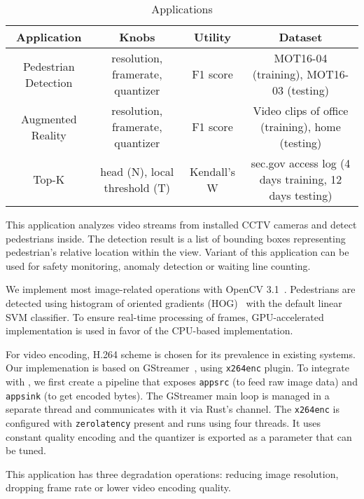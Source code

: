\begin{table*}
  \small
  \centering
  \begin{tabular}{|c|c|c|c|}
    \hline
    Application & Knobs & Utility & Dataset \\
    \hline
    Pedestrian Detection & resolution, framerate, quantizer
                        & F1 score & MOT16-04 (training), MOT16-03 (testing) \\
    \hline
    Augmented Reality & resolution, framerate, quantizer
                        & F1 score & Video clips of office (training), home (testing) \\
    \hline
    Top-K & head (N), local threshold (T) & Kendall's W & sec.gov access log
                                                          (4 days training, 12 days testing)  \\
    \hline
  \end{tabular}
  \caption{\sysname{} Applications}
  \label{tab:apps}
\end{table*}

 This application analyzes video streams from
installed CCTV cameras and detect pedestrians inside. The detection result is a
list of bounding boxes representing pedestrian's relative location within the
view. Variant of this application can be used for safety monitoring, anomaly
detection or waiting line counting.

We implement most image-related operations with OpenCV
3.1~\cite{opencvlibrary}. Pedestrians are detected using histogram of oriented
gradients (HOG)~\cite{dalal2005histograms} with the default linear SVM
classifier. To ensure real-time processing of frames, GPU-accelerated
implementation is used in favor of the CPU-based implementation.

For video encoding, H.264 scheme is chosen for its prevalence in existing
systems. Our implemenation is based on GStreamer~\cite{gstreamer}, using
\texttt{x264enc} plugin. To integrate with \sysname{}, we first create a
pipeline that exposes \texttt{appsrc} (to feed raw image data) and
\texttt{appsink} (to get encoded bytes). The GStreamer main loop is managed in a
separate thread and \sysname{} communicates with it via Rust's channel. The
\texttt{x264enc} is configured with \texttt{zerolatency} present and runs using
four threads. It uses constant quality encoding and the quantizer is exported as
a parameter that can be tuned.

This application has three degradation operations: reducing image resolution,
dropping frame rate or lower video encoding quality.

